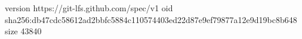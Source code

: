 version https://git-lfs.github.com/spec/v1
oid sha256:db47cdc58612ad2bbfc5884c110574403ed22d87e9ef79877a12e9d19bc8b648
size 43840
